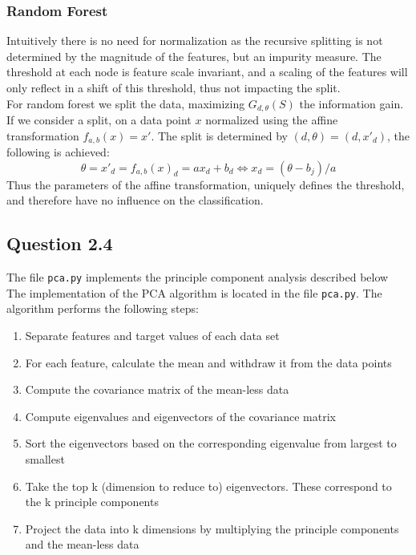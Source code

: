 \documentclass{article}
\begin{document}
\subsubsection{Random Forest}
Intuitively there is no need for normalization as the recursive splitting is not determined by the magnitude of the features, but an impurity measure. The threshold at each node is feature scale invariant, and a scaling of the features will only reflect in a shift of this threshold, thus not impacting the split. \\
For random forest we split the data, maximizing $G_{d,\theta}(S)$ the information gain. If we consider a split, on a data point $x$ normalized using the affine transformation  $f_{a,b}(x) = x'$. The split is determined by $(d,\theta)=(d,x'_d)$, the following is achieved:
\begin{equation}
\theta = x'_d = f_{a,b}(x)_d = ax_d + b_d \Leftrightarrow
x_d = (\theta -b_j)/a
\end{equation}
Thus the parameters of the affine transformation, uniquely defines the threshold, and therefore have no influence on the classification.
\subsection{Question 2.4}
The file \texttt{pca.py} implements the principle component analysis described below \\
The implementation of the PCA algorithm is located in the file \texttt{pca.py}. The algorithm performs the following steps:
\begin{enumerate}
\item{Separate features and target values of each data set}
\item{For each feature, calculate the mean and withdraw it from the data points}
\item{Compute the covariance matrix of the mean-less data}
\item{Compute eigenvalues and eigenvectors of the covariance matrix}
\item{Sort the eigenvectors based on the corresponding eigenvalue from largest to smallest}
\item{Take the top k (dimension to reduce to) eigenvectors. These correspond to the k principle components}
\item{Project the data into k dimensions by multiplying the principle components and the mean-less data}
\end{enumerate}
\end{document}
